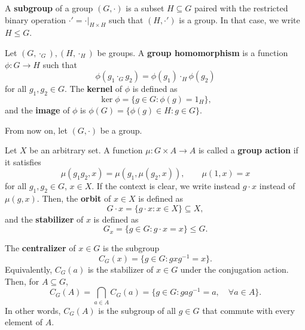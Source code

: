 \documentclass[class=report, crop=false]{standalone}
\begin{document}
\begin{boxedenv}\begin{definition}
    A \textbf{subgroup} of a group $(G,\cdot)$ is a subset $H\subseteq G$ paired with the restricted binary operation $\cdot' = \left. \cdot \right|_{H\times H}$ such that $(H,\cdot')$ is a group. In that case, we write $H\le G$.
\end{definition}\end{boxedenv}

\begin{boxedenv}\begin{definition}
    Let $(G,\cdot_G),(H,\cdot_H)$ be groups. A \textbf{group homomorphism} is a function $\phi: G\to H$ such that
    \[\phi(g_1\cdot_G g_2) = \phi(g_1)\cdot_H \phi(g_2)\]
    for all $g_1,g_2\in G$. The \textbf{kernel} of $\phi$ is defined as
    \[\ker{\phi}=\{g\in G: \phi(g)=1_H\},\]
    and the \textbf{image} of $\phi$ is $\phi(G)=\{\phi(g)\in H: g\in G\}$.
\end{definition}\end{boxedenv}




\newpage

\noindent From now on, let $(G,\cdot)$ be a group.
\bigskip

\begin{boxedenv}\begin{definition}
    Let $X$ be an arbitrary set. A function $\mu: G\times A \to A$ is called a \textbf{group action} if it satisfies
    \[\mu(g_1 g_2, x) = \mu(g_1, \mu(g_2,x)), \qquad \mu(1,x) = x\]
    for all $g_1,g_2\in G$, $x\in X$. If the context is clear, we write instead $g\cdot x$ instead of $\mu(g,x)$. Then, the \textbf{orbit} of $x\in X$ is defined as
    \[G\cdot x = \{g\cdot x: x\in X\} \subseteq X,\]
    and the \textbf{stabilizer} of $x$ is defined as
    \[G_x = \{g\in G: g\cdot x = x\} \leq G.\]
\end{definition}\end{boxedenv}

\begin{boxedenv}\begin{definition}
    The \textbf{centralizer} of $x\in G$ is the subgroup
    \[C_G(x) = \{g\in G: gxg^{-1} = x\}.\]
    Equivalently, $C_G(a)$ is the stabilizer of $x\in G$ under the conjugation action. Then, for $A\subseteq G$,
    \[C_G(A) = \bigcap_{a\in A} C_G(a) = \{g\in G: gag^{-1} = a, \quad \forall a\in A\}.\]
    In other words, $C_G(A)$ is the subgroup of all $g\in G$ that commute with every element of $A$.
\end{definition}\end{boxedenv}
\end{document}
